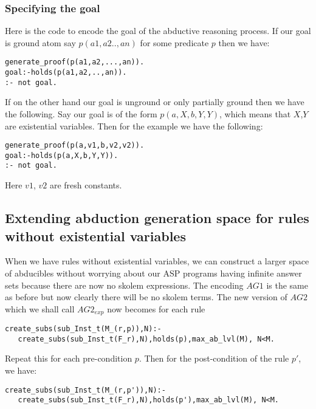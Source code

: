 \documentclass[sigconf]{acmart}
\begin{document}
\subsubsection{Specifying the goal}
Here is the code to encode the goal of the abductive reasoning process. If our
goal is ground atom say $p(a1,a2..,an)$ for some predicate $p$ then we
have:
\begin{verbatim}
generate_proof(p(a1,a2,...,an)).
goal:-holds(p(a1,a2,..,an)).
:- not goal.
\end{verbatim}
If on the other hand our goal is unground or only partially ground then we have the following. Say our goal is of the form $p(a,X,b,Y,Y)$, which means that $X$,$Y$ are existential variables. Then for the example we have the following:
\begin{verbatim}
generate_proof(p(a,v1,b,v2,v2)).
goal:-holds(p(a,X,b,Y,Y)).
:- not goal.
\end{verbatim}
Here $v1$, $v2$ are fresh constants.

\subsection{Extending abduction generation space for rules without existential variables}


When we have rules without existential variables, we can construct a larger
space of abducibles without worrying about our ASP programs having infinite
answer sets because there are now no skolem expressions. The encoding $AG1$ is
the same as before but now clearly there will be no skolem terms. The new
version of $AG2$ which we shall call $AG2_{exp}$ now becomes for each rule 
\begin{lstlisting}[frame=none]
create_subs(sub_Inst_t(M_(r,p)),N):-
   create_subs(sub_Inst_t(F_r),N),holds(p),max_ab_lvl(M), N<M.   
\end{lstlisting}

Repeat this for each pre-condition $p$. Then for the post-condition of the rule $p'$, we have:
\begin{lstlisting}[frame=none]
create_subs(sub_Inst_t(M_(r,p')),N):-
   create_subs(sub_Inst_t(F_r),N),holds(p'),max_ab_lvl(M), N<M.   
\end{lstlisting}
 
\end{document}
